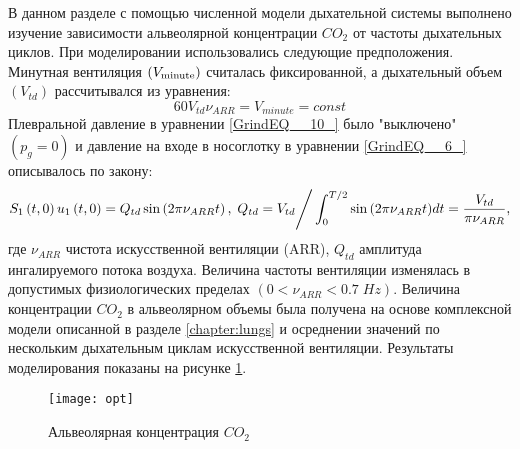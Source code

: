 В данном разделе с помощью численной модели дыхательной системы выполнено изучение зависимости альвеолярной концентрации $CO_{2} $ от частоты дыхательных циклов. При моделировании использовались следующие предположения. Минутная вентиляция $\left(V_{{\rm minute}}\right)$ считалась фиксированной, а дыхательный объем $\left(V_{td} \right)$ рассчитывался из уравнения:
\begin{equation} \label{GrindEQ__38_} 
60V_{td} \nu _{ARR} =V_{minute} =const 
\end{equation} 
Плевральной давление в уравнении \eqref{GrindEQ__10_} было "выключено" $\left(p_{g} =0\right)$ и давление на входе в носоглотку в уравнении \eqref{GrindEQ__6_} описывалось по закону:
\begin{equation} \label{GrindEQ__39_} 
S_{1} \left(t,0\right)u_{1} \left(t,0\right)=Q_{td} \sin \left(2\pi \nu _{ARR} t\right),\; Q_{td} ={V_{td} \mathord{\left/ {\vphantom {V_{td}  \int _{0}^{{T\mathord{\left/ {\vphantom {T 2}} \right. \kern-\nulldelimiterspace} 2} }\sin \left(2\pi \nu _{ARR} t\right) }} \right. \kern-\nulldelimiterspace} \int _{0}^{{T\mathord{\left/ {\vphantom {T 2}} \right. \kern-\nulldelimiterspace} 2} }\sin \left(2\pi \nu _{ARR} t\right) } dt=\frac{V_{td} }{\pi \nu _{ARR} } ,  
\end{equation} 
где $\nu _{ARR} $ чистота искусственной вентиляции (ARR), $Q_{td} $ амплитуда ингалируемого потока воздуха. Величина частоты вентиляции изменялась в допустимых физиологических пределах $\left(0<\nu _{ARR} <0.7\; Hz\right)$. Величина концентрации $CO_{2} $ в альвеолярном объемы была получена на основе комплексной модели описанной в разделе \ref{chapter:lungs} и осреднении значений по нескольким дыхательным циклам искусственной вентиляции.  Результаты моделирования показаны на рисунке \ref{opt}.

\begin{figure}[!ht]
	\centering
	\texttt{[image: opt]}
	\caption{Альвеолярная концентрация $CO_{2} $} 
	\label{opt}
\end{figure}

